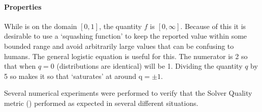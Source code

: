 \paragraph{Properties}
While \hell{} is on the domain $[0,1]$, the quantity $f$ is $[0,\infty]$. Because of this it is desirable to use a `squashing function' to keep the reported \xQ{} value within some bounded range and avoid arbitrarily large values that can be confusing to humans. The general logistic equation is useful for this.
The numerator is 2 so that when $q=0$ (distributions are identical) \xQ{} will be 1. Dividing the quantity $q$ by 5 so makes it so that \xQ{} `saturates' at around $\text{q}=\pm1$.

Several numerical experiments were performed to verify that the Solver Quality metric (\xQ{}) performed as expected in several different situations.
